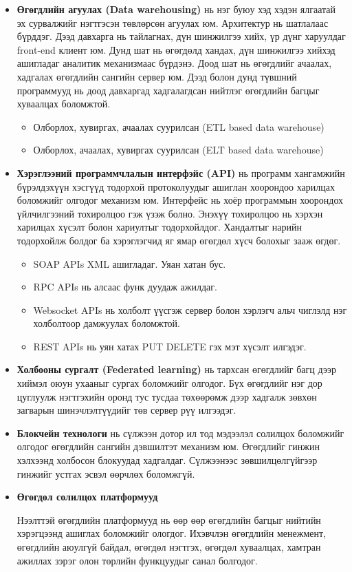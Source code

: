 \begin{itemize}
    \item \textbf{Өгөгдлийн агуулах (Data warehousing)} нь нэг буюу хэд хэдэн ялгаатай эх сурвалжийг нэгтгэсэн төвлөрсөн агуулах юм. Архитектур нь шатлалаас бүрддэг. Дээд давхарга нь тайлагнах, дүн шинжилгээ хийх, үр дүнг харуулдаг front-end клиент юм. Дунд шат нь өгөгдөлд хандах, дүн шинжилгээ хийхэд ашигладаг аналитик механизмаас бүрдэнэ. Доод шат нь өгөгдлийг ачаалах, хадгалах өгөгдлийн сангийн сервер юм. Дээд болон дунд түвшний программууд нь доод давхаргад хадгалагдсан нийтлэг өгөгдлийн багцыг хуваалцах боломжтой.
    \begin{itemize}
        \item Олборлох, хувиргах, ачаалах суурилсан (ETL based data warehouse)
        \item Олборлох, ачаалах, хувиргах суурилсан (ELT based data warehouse)
    \end{itemize}

    \item \textbf{Хэрэглээний программчлалын интерфэйс (API)} нь программ хангамжийн бүрэлдэхүүн хэсгүүд тодорхой протоколуудыг ашиглан хоорондоо харилцах боломжийг олгодог механизм юм. Интерфейс нь хоёр программын хоорондох үйлчилгээний тохиролцоо гэж үзэж болно. Энэхүү тохиролцоо нь хэрхэн харилцах хүсэлт болон хариултыг тодорхойлдог. Хандалтыг нарийн тодорхойлж болдог ба хэрэглэгчид яг ямар өгөгдөл хүсч болохыг зааж өгдөг.
    \begin{itemize}
        \item SOAP APIs XML ашигладаг. Уяан хатан бус.
        \item RPC APIs нь алсаас функ дуудаж ажилдаг.
        \item Websocket APIs нь холболт үүсгэж сервер болон хэрлэгч альч чиглэлд нэг холболтоор дамжуулах боломжтой.
        \item REST APIs нь уян хатах PUT DELETE гэх мэт хүсэлт илгэдэг.
    \end{itemize}
    
    \item \textbf{Холбооны сургалт (Federated learning)} нь тархсан өгөгдлийг багц дээр хиймэл оюун ухааныг сургах боломжийг олгодог. Бүх өгөгдлийг нэг дор цуглуулж нэгтгэхийн оронд тус тусдаа төхөөрөмж дээр хадгалж зөвхөн загварын шинэчлэлтүүдийг төв сервер рүү илгээдэг.

    \item \textbf{Блокчейн технологи} нь сүлжээн дотор ил тод мэдээлэл солилцох боломжийг олгодог өгөгдлийн сангийн дэвшилтэт механизм юм. Өгөгдлийг гинжин хэлхээнд холбосон блокуудад хадгалдаг. Сүлжээнээс зөвшилцөлгүйгээр гинжийг устгах эсвэл өөрчлөх боломжгүй.

    \item \textbf{Өгөгдөл солилцох платформууд}
    
    Нээлттэй өгөгдлийн платформууд нь өөр өөр өгөгдлийн багцыг нийтийн хэрэгцээнд ашиглах боломжийг ологдог. Ихэвчлэн өгөгдлийн менежмент, өгөгдлийн аюулгүй байдал, өгөгдөл нэгтгэх, өгөгдөл хуваалцах, хамтран ажиллах зэрэг олон төрлийн функцуудыг санал болгодог. 


\end{itemize}

